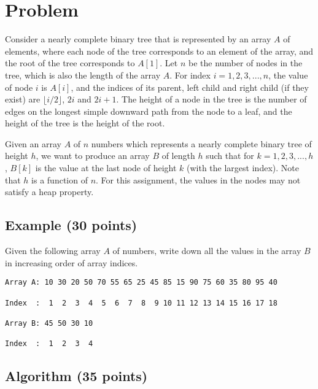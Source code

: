 \documentclass[12pt]{article}
\begin{document}
\section*{Problem}

Consider a nearly complete binary tree that is represented by an array $A$ of elements,
where each node of the tree corresponds to an element of the array,
and the root of the tree corresponds to $A[1]$. Let $n$ be the number of nodes
in the tree, which is also the length of the array $A$.
For index $i = 1, 2, 3, ..., n$, the value of node $i$ is $A[i]$,
and the indices of its parent, left child and right child (if they exist)
are $\lfloor{i/2}\rfloor$, $2i$ and $2i+1$.
The height of a node in the tree is the number of edges on the longest
simple downward path from the node to a leaf, and the height of
the tree is the height of the root.

Given an array $A$ of $n$ numbers which represents a nearly complete binary tree
of height $h$, we want to produce an array $B$ of length $h$ such that
for $k = 1, 2, 3, ..., h$, $B[k]$ is the value at the last node of height $k$
(with the largest index). Note that $h$ is a function of $n$.
For this assignment, the values in the nodes may not satisfy a heap property.

\subsection*{Example (30 points)}

Given the following array $A$ of numbers, write down all the values
in the array $B$ in increasing order of array indices.

\begin{verbatim}
Array A: 10 30 20 50 70 55 65 25 45 85 15 90 75 60 35 80 95 40

Index  :  1  2  3  4  5  6  7  8  9 10 11 12 13 14 15 16 17 18

Array B: 45 50 30 10

Index  :  1  2  3  4
\end{verbatim}
\newpage
\subsection*{Algorithm (35 points)}
\end{document}
